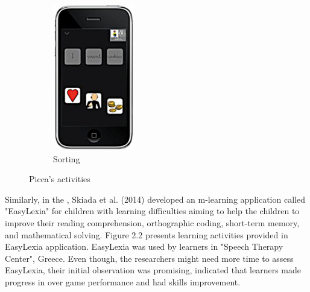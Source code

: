 \begin{figure}[!hbt]
\begin{subfigure}{0.19\textwidth}
        \includegraphics[width=\textwidth]{poten5}
        \caption{Sorting}
    \end{subfigure}
    \caption{Picca's activities \cite{fernandez2013mobile}}
\end{figure}


Similarly, in the \cite{skiada2014easylexia}, Skiada et al. (2014) developed an m-learning application called "EasyLexia" for children with learning difficulties aiming to help the children to improve their reading comprehension, orthographic coding, short-term memory, and mathematical solving. Figure 2.2 presents learning activities provided in EasyLexia application. EasyLexia was used by learners in "Speech Therapy Center", Greece. Even though, the researchers might need more time to assess EasyLexia, their initial observation was promising, indicated that learners made progress in over game performance and had skills improvement. 


